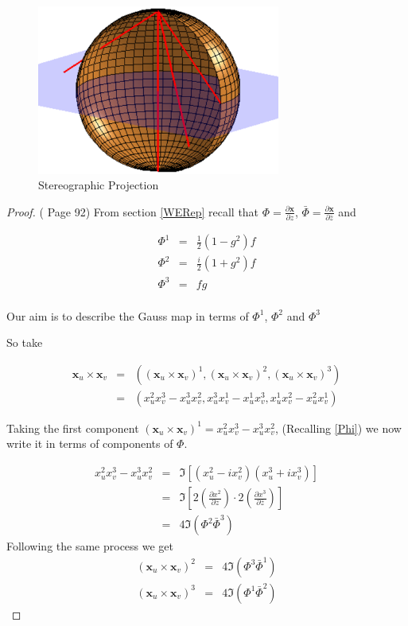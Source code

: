 \begin{figure}[htbp]
	\centering
       \includegraphics[width=8cm]{Images/Stereographic.eps}
   \caption{Stereographic Projection}
   \label{fig:stereographic}
\end{figure} 

\begin{proof}{(\cite{OPR} Page 92)}
From section \ref{WERep} recall that $\Phi = \frac{\partial \mathbf x}{\partial z}$, $\bar{\Phi} = \frac{\partial \mathbf x}{\partial \bar{z}}$ and

\begin{eqnarray}
\nonumber
\Phi^1 &=& \frac{1}{2}(1-g^2)f \\
\nonumber
\Phi^2 &=& \frac{i}{2}(1+g^2)f \\
\nonumber
\Phi^3 &=& fg\\
\end{eqnarray}

Our aim is to describe the Gauss map in terms of $\Phi^1$, $\Phi^2$ and $\Phi^3$

So take

\begin{eqnarray}
\nonumber
\mathbf x_u \times \mathbf x_v &=& ((\mathbf x_u \times \mathbf x_v)^1,(\mathbf x_u \times \mathbf x_v)^2,(\mathbf x_u \times \mathbf x_v)^3) \\
\nonumber
&=& (x_u^2x_v^3 - x_u^3x_v^2, x_u^3x_v^1-x^1_ux^3_v,x^1_ux^2_v-x^2_ux^1_v)
\end{eqnarray}

Taking the first component $(\mathbf x_u \times \mathbf x_v)^1 = x_u^2x_v^3 - x_u^3x_v^2$, (Recalling \ref{Phi}) we now write it in terms of components of $\Phi$.

\begin{eqnarray}
\nonumber
x_u^2x_v^3 - x_u^3x_v^2 &=& \Im[(x_u^2-ix_v^2)(x_u^3+ix_v^3)] \\
\nonumber 
&=& \Im\left[2\left(\frac{\partial x^2}{\partial z}\right)\cdot 2\left(\frac{\partial x^3}{\partial\bar{z}}\right)\right] \\
\nonumber
&=& 4 \Im(\Phi^2\bar{\Phi}^3)
\end{eqnarray} 
Following the same process we get
\begin{eqnarray}
\nonumber
(\mathbf x_u \times \mathbf x_v)^2 &=& 4 \Im(\Phi^3\bar{\Phi}^1) \\ 
\nonumber
(\mathbf x_u \times \mathbf x_v)^3 &=& 4 \Im(\Phi^1\bar{\Phi}^2)
\end{eqnarray}


\end{proof}
